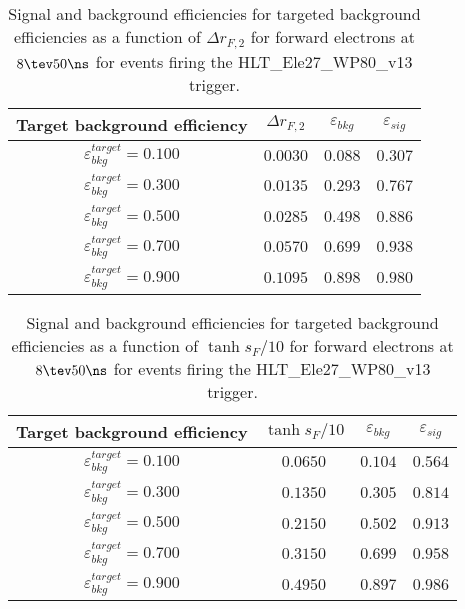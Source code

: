 \clearpage

\begin{table}[!bht]
  \begin{center}
    \begin{tabular}{cccc}
      \hline
      Target background efficiency & $\Delta r_{F,2}$ & $\varepsilon_{bkg}$ & $\varepsilon_{sig}$ \\ 
      \hline
      $\varepsilon_{bkg}^{target} = 0.100$ & $  0.0030$ & $0.088$ & $0.307$ \\
      $\varepsilon_{bkg}^{target} = 0.300$ & $  0.0135$ & $0.293$ & $0.767$ \\
      $\varepsilon_{bkg}^{target} = 0.500$ & $  0.0285$ & $0.498$ & $0.886$ \\
      $\varepsilon_{bkg}^{target} = 0.700$ & $  0.0570$ & $0.699$ & $0.938$ \\
      $\varepsilon_{bkg}^{target} = 0.900$ & $  0.1095$ & $0.898$ & $0.980$ \\
      \hline
    \end{tabular}
    \caption{Signal and background efficiencies for targeted background efficiencies as a function of $\Delta r_{F,2}$ for forward electrons at $8\tev 50\ns$ for events firing the HLT\_Ele27\_WP80\_v13 trigger.}
    \label{tab:eff_rej_r2F_beam_8_50_trigger_27_F}
  \end{center}
\end{table}

\clearpage

\begin{table}[!bht]
  \begin{center}
    \begin{tabular}{cccc}
      \hline
      Target background efficiency & $\tanh{s_F/10}$ & $\varepsilon_{bkg}$ & $\varepsilon_{sig}$ \\ 
      \hline
      $\varepsilon_{bkg}^{target} = 0.100$ & $  0.0650$ & $0.104$ & $0.564$ \\
      $\varepsilon_{bkg}^{target} = 0.300$ & $  0.1350$ & $0.305$ & $0.814$ \\
      $\varepsilon_{bkg}^{target} = 0.500$ & $  0.2150$ & $0.502$ & $0.913$ \\
      $\varepsilon_{bkg}^{target} = 0.700$ & $  0.3150$ & $0.699$ & $0.958$ \\
      $\varepsilon_{bkg}^{target} = 0.900$ & $  0.4950$ & $0.897$ & $0.986$ \\
      \hline
    \end{tabular}
    \caption{Signal and background efficiencies for targeted background efficiencies as a function of $\tanh{s_F/10}$ for forward electrons at $8\tev 50\ns$ for events firing the HLT\_Ele27\_WP80\_v13 trigger.}
    \label{tab:eff_rej_sF_beam_8_50_trigger_27_F}
  \end{center}
\end{table}


